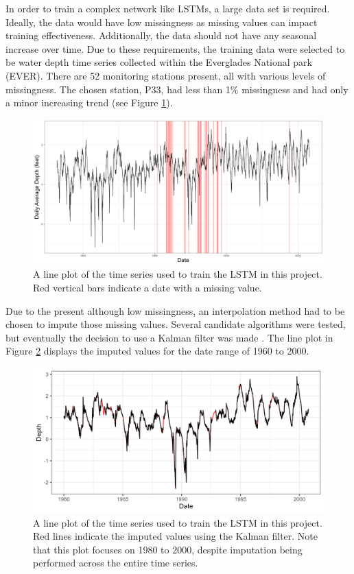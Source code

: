 In order to train a complex network like LSTMs, a large data set is required. Ideally, the data would have low missingness as missing values can impact training effectiveness. Additionally, the data should not have any seasonal increase over time. Due to these requirements, the training data were selected to be water depth time series collected within the Everglades National park (EVER). There are 52 monitoring stations present, all with various levels of missingness. The chosen station, P33, had less than 1\% missingness and had only a minor increasing trend (see Figure \ref{fig:P33}).

\begin{figure}[ht]
    \centering
    \includegraphics[width=0.9\linewidth]{"Figures/P33_Time_Series_Missingness.png"}
    \caption{A line plot of the time series used to train the LSTM in this project. Red vertical bars indicate a date with a missing value.}
    \label{fig:P33}
\end{figure}

Due to the present although low missingness, an interpolation method had to be chosen to impute those missing values. Several candidate algorithms were tested, but eventually the decision to use a Kalman filter was made \citep{kalmanfilter}. The line plot in Figure \ref{fig:P33_Interpolated} displays the imputed values for the date range of 1960 to 2000.

\begin{figure}[ht]
    \centering
    \includegraphics[width=0.9\linewidth]{"Figures/Interpolation_60_20.png"}
    \caption{A line plot of the time series used to train the LSTM in this project. Red lines indicate the imputed values using the Kalman filter. Note that this plot focuses on 1980 to 2000, despite imputation being performed across the entire time series.}
    \label{fig:P33_Interpolated}
\end{figure}